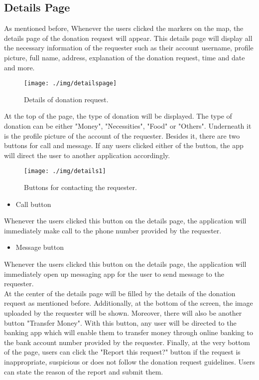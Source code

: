 \documentclass[conference]{IEEEtran}
\begin{document}
\subsection{Details Page}

\par As mentioned before, Whenever the users clicked the markers on the map, the details page of the donation request will appear. This details page will display all the necessary information of the requester such as their account username, profile picture, full name, address, explanation of the donation request, time and date and more.

\begin{figure}[h!]
\texttt{[image: ./img/detailspage]}
\centering
\caption{Details of donation request.}
\end{figure}
At the top of the page, the type of donation will be displayed. The type of donation can be either "Money", "Necessities", "Food" or "Others". Underneath it is the profile picture of the account of the requester. Besides it, there are two buttons for call and message. If any users clicked either of the button, the app will direct the user to another application accordingly.

\begin{figure}[h!]
\texttt{[image: ./img/details1]}
\centering
\caption{Buttons for contacting the requester.}
\end{figure}

\begin{itemize}
\item Call button
\end{itemize}
Whenever the users clicked this button on the details page, the application will immediately make call to the phone number provided by the requester.
\begin{itemize}
\item Message button
\end{itemize}
Whenever the users clicked this button on the details page, the application will immediately open up messaging app for the user to send message to the requester.\\

At the center of the details page will be filled by the details of the donation request as mentioned before. Additionally, at the bottom of the screen, the image uploaded by the requester will be shown. Moreover, there will also be another button "Transfer Money". With this button, any user will be directed to the banking app which will enable them to transfer money through online banking to the bank account number provided by the requester. Finally, at the very bottom of the page, users can click the "Report this request?" button if the request is inappropriate, suspicious or does not follow the donation request guidelines. Users can state the reason of the report and submit them.
\end{document}
